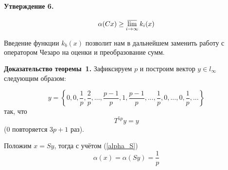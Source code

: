 \documentclass[a5paper,12pt,openbib]{report}
\begin{document}
\paragraph{Утверждение 6.}
\begin{equation}\label{alpha_greater_k_b}
	\alpha (Cx) \geq \varlimsup_{i\to \infty} k_i(x)
\end{equation}

Введение функции $k_b(x)$ позволит нам в дальнейшем заменить работу с оператором Чезаро
на оценки и преобразование сумм.

\textbf{Доказательство теоремы~1.}
Зафиксируем $p$ и построим вектор $y\in l_\infty$ следующим образом:

\begin{equation}\label{y_construction}
	y = \left\{
		0, 0, \frac{1}{p}, \frac{2}{p}, %
		...,
		\frac{p-1}{p}, 1, \frac{p-1}{p},
		...,
		\frac{1}{p},
		0, ..., 0,
		\frac{1}{p}, ...
	\right\}
\end{equation}
так, что
\begin{equation}\label{T_y}
	T^{5p}y = y
\end{equation}
(0 повторяется $3p+1$ раз).

Положим $x = Sy$, тогда с учётом (\ref{alpha_S})
\begin{equation}\label{alpha_x}
	\alpha (x) = \alpha (Sy) = \frac{1}{p}
\end{equation}
\end{document}
